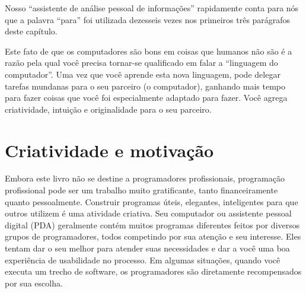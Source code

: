 Nosso ``assistente de análise pessoal de informações'' rapidamente
conta para nós que a palavra ``para'' foi utilizada dezesseis vezes nos
primeiros três parágrafos deste capítulo.

Este fato de que os computadores são bons em coisas
que humanos não são é a razão pela qual você precisa tornar-se
qualificado em falar a ``linguagem do computador''. Uma vez
que você aprende esta nova linguagem, pode delegar tarefas
mundanas para o seu parceiro (o computador), ganhando mais tempo
para fazer coisas que você foi especialmente adaptado para fazer. Você agrega
criatividade, intuição e originalidade para o seu parceiro.

\section{Criatividade e motivação}


Embora este livro não se destine a programadores profissionais, programação
profissional pode ser um trabalho muito gratificante, tanto financeiramente
quanto pessoalmente. Construir programas úteis, elegantes, inteligentes para
que outros utilizem é uma atividade criativa. Seu computador ou assistente
pessoal digital (PDA) geralmente contém muitos programas diferentes feitos por
diversos grupos de programadores, todos competindo por sua atenção e seu
interesse. Eles tentam dar o seu melhor para atender suas necessidades e dar a
você uma boa experiência de usabilidade no processo. Em algumas situações,
quando você executa um trecho de software, os programadores são diretamente
recompensados por sua escolha.

